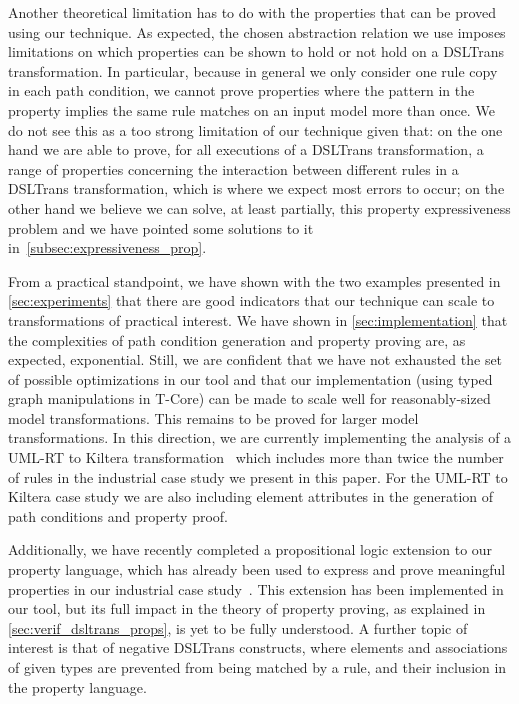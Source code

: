 Another theoretical limitation has to do with the properties that can be proved using our technique. As expected, the chosen abstraction relation we use imposes limitations on which properties can be shown to hold or not hold on a DSLTrans transformation. In particular, because in general we only consider one rule copy in each path condition, we cannot prove properties where the pattern in the property implies the same rule matches on an input model more than once. We do not see this as a too strong limitation of our technique given that: on the one hand we are able to prove, for all executions of a DSLTrans transformation, a range of properties concerning the interaction between different rules in a DSLTrans transformation, which is where we expect most errors to occur; on the other hand we believe we can solve, at least partially, this property expressiveness problem and we have pointed some solutions to it in~\cref{subsec:expressiveness_prop}. 

From a practical standpoint, we have shown with the two examples presented in \cref{sec:experiments} that there are good indicators that our technique can scale to transformations of practical interest. We have shown in \cref{sec:implementation} that the complexities of path condition generation and property proving are, as expected, exponential. Still, we are confident that we have not exhausted the set of possible optimizations in our tool and that our implementation (using typed graph manipulations in T-Core) can be made to scale well for reasonably-sized model transformations. This remains to be proved for larger model transformations. In this direction, we are currently implementing the analysis of a UML-RT to Kiltera transformation~\cite{posse:10} which includes more than twice the number of rules in the industrial case study we present in this paper. For the UML-RT to Kiltera case study we are also including element attributes in the generation of path conditions and property proof.

Additionally, we have recently completed a propositional logic extension to our property language, which has already been used to express and prove meaningful properties in our industrial case study~\cite{gehan:13,conf/gg/SelimLCDO14}. This extension has been implemented in our tool, but its full impact in the theory of property proving, as explained in \cref{sec:verif_dsltrans_props}, is yet to be fully understood. A further topic of interest is that of negative DSLTrans constructs, where elements and associations of given types are prevented from being matched by a rule, and their inclusion in the property language.

